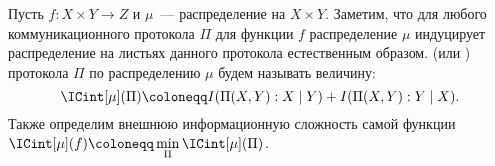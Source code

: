 






\begin{definition*}
    Пусть $f: X \times Y \to Z$ и $\mu$~--- распределение на $X \times Y$. Заметим, что для любого
    коммуникационного протокола $\Pi$ для функции $f$ распределение $\mu$ индуцирует распределение на
    листьях данного протокола естественным образом.  (или
    ) протокола $\Pi$ по распределению $\mu$ будем называть
    величину:
    $$\ICint[\mu](\Pi) \coloneqq I(\Pi(X, Y) : X \mid Y) + I(\Pi(X, Y) : Y \mid X).$$
    Также определим внешнюю информационную сложность самой функции
    $\ICint[\mu](f) \coloneqq \min\limits_{\Pi} \ICint[\mu](\Pi)$.
\end{definition*}









